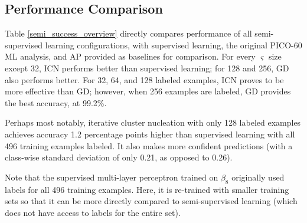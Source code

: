 \documentclass[10pt]{article}
\begin{document}
\subsection{Performance Comparison}

Table \ref{semi_success_overview} directly compares performance of all semi-supervised learning configurations, with supervised learning, the original PICO-60 ML analysis, and AP provided as baselines for comparison. For every $\varsigma$ size except 32, ICN performs better than supervised learning; for 128 and 256, GD also performs better. For 32, 64, and 128 labeled examples, ICN proves to be more effective than GD; however, when 256 examples are labeled, GD provides the best accuracy, at 99.2\%.

Perhaps most notably, iterative cluster nucleation with only 128 labeled examples achieves accuracy 1.2 percentage points higher than supervised learning with all 496 training examples labeled. It also makes more confident predictions (with a class-wise standard deviation of only 0.21, as opposed to 0.26).

Note that the supervised multi-layer perceptron trained on $\beta _8$ originally used labels for all 496 training examples. Here, it is re-trained with smaller training sets so that it can be more directly compared to semi-supervised learning (which does not have access to labels for the entire set).
\end{document}
